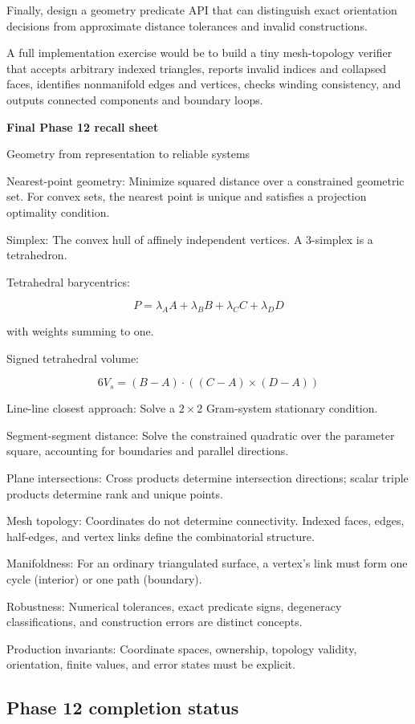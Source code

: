 Finally, design a geometry predicate API that can distinguish exact orientation decisions from approximate distance tolerances and invalid constructions.

A full implementation exercise would be to build a tiny mesh-topology verifier that accepts arbitrary indexed triangles, reports invalid indices and collapsed faces, identifies nonmanifold edges and vertices, checks winding consistency, and outputs connected components and boundary loops.

\textbf{Final Phase 12 recall sheet}

Geometry from representation to reliable systems

Nearest-point geometry: Minimize squared distance over a constrained geometric set. For convex sets, the nearest point is unique and satisfies a projection optimality condition.

Simplex: The convex hull of affinely independent vertices. A 3-simplex is a tetrahedron.

Tetrahedral barycentrics:

\[
P=\lambda_AA+\lambda_BB+\lambda_CC+\lambda_DD
\]

with weights summing to one.

Signed tetrahedral volume:

\[
6V_s=(B-A)\cdot((C-A)\times(D-A))
\]

Line-line closest approach: Solve a \(2\times2\) Gram-system stationary condition.

Segment-segment distance: Solve the constrained quadratic over the parameter square, accounting for boundaries and parallel directions.

Plane intersections: Cross products determine intersection directions; scalar triple products determine rank and unique points.

Mesh topology: Coordinates do not determine connectivity. Indexed faces, edges, half-edges, and vertex links define the combinatorial structure.

Manifoldness: For an ordinary triangulated surface, a vertex's link must form one cycle (interior) or one path (boundary).

Robustness: Numerical tolerances, exact predicate signs, degeneracy classifications, and construction errors are distinct concepts.

Production invariants: Coordinate spaces, ownership, topology validity, orientation, finite values, and error states must be explicit.

\subsection{Phase 12 completion status}\label{04-visual-computing-ii-ch023-phase-12-completion-status}

